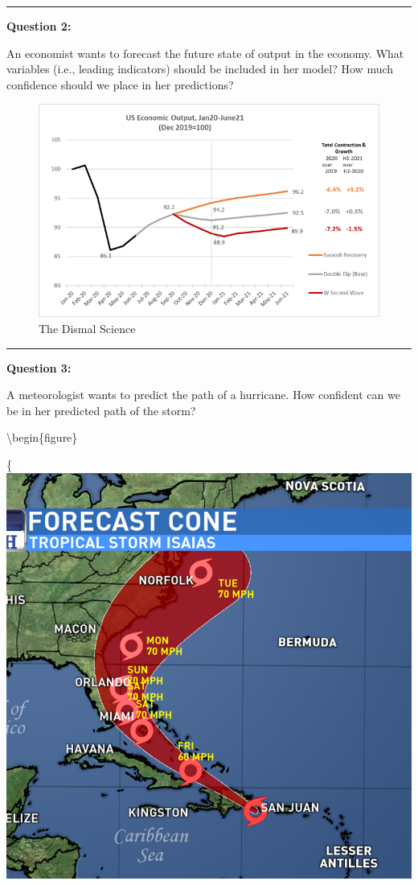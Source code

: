 \documentclass[
]{book}
\begin{document}
\begin{center}\rule{0.5\linewidth}{0.5pt}\end{center}

\textbf{Question 2:}

An economist wants to forecast the future state of output in the economy. What variables (i.e., leading indicators) should be included in her model? How much confidence should we place in her predictions?

\begin{figure}

{\centering \includegraphics[width=0.8\linewidth]{images/ECONOMIC} 

}

\caption{The Dismal Science}\label{fig:unnamed-chunk-4}
\end{figure}

\begin{center}\rule{0.5\linewidth}{0.5pt}\end{center}

\textbf{Question 3:}

A meteorologist wants to predict the path of a hurricane. How confident can we be in her predicted path of the storm?

\textbackslash begin\{figure\}

\{\centering \includegraphics[width=0.7\linewidth]{images/FORECASTCONE}
\end{document}

